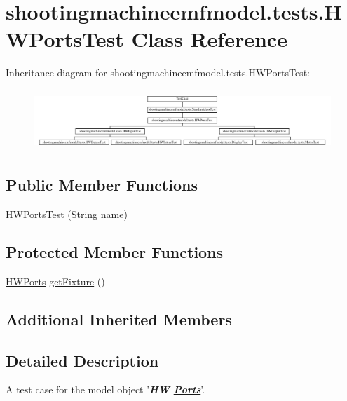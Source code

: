\hypertarget{classshootingmachineemfmodel_1_1tests_1_1_h_w_ports_test}{\section{shootingmachineemfmodel.\-tests.\-H\-W\-Ports\-Test Class Reference}
\label{classshootingmachineemfmodel_1_1tests_1_1_h_w_ports_test}
}
Inheritance diagram for shootingmachineemfmodel.\-tests.\-H\-W\-Ports\-Test\-:\begin{figure}[H]
\begin{center}
\leavevmode
\includegraphics[height=2.310231cm]{classshootingmachineemfmodel_1_1tests_1_1_h_w_ports_test}
\end{center}
\end{figure}
\subsection*{Public Member Functions}
\begin{DoxyCompactItemize}
\item 
\hyperlink{classshootingmachineemfmodel_1_1tests_1_1_h_w_ports_test_a3c329b827a2523b726946b501ef90ee1}{H\-W\-Ports\-Test} (String name)
\end{DoxyCompactItemize}
\subsection*{Protected Member Functions}
\begin{DoxyCompactItemize}
\item 
\hyperlink{interfaceshootingmachineemfmodel_1_1_h_w_ports}{H\-W\-Ports} \hyperlink{classshootingmachineemfmodel_1_1tests_1_1_h_w_ports_test_abf0c0be966493158fa131bfe05ea7858}{get\-Fixture} ()
\end{DoxyCompactItemize}
\subsection*{Additional Inherited Members}


\subsection{Detailed Description}
A test case for the model object '{\itshape {\bfseries H\-W \hyperlink{interfaceshootingmachineemfmodel_1_1_ports}{Ports}}}'.

